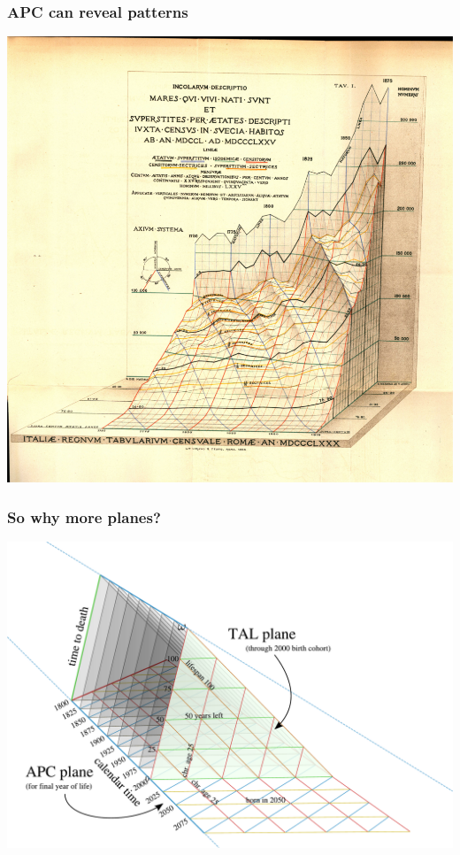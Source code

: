 \documentclass[20pt]{beamer}
\begin{document}

\begin{frame}
\frametitle{APC can reveal patterns}
\begin{center}
\includegraphics[trim 100 100 300
300,scale=.5]{Figures/Perozzo1000px_cropped_adj.png}
\end{center}
\end{frame}


\begin{frame}
\frametitle{So why more planes?}
\vspace{-4em}
\begin{center}
\includegraphics[scale=.8]{Figures/TALisomarkedup2PAA.pdf}
\end{center}
\end{frame}
\end{document}
